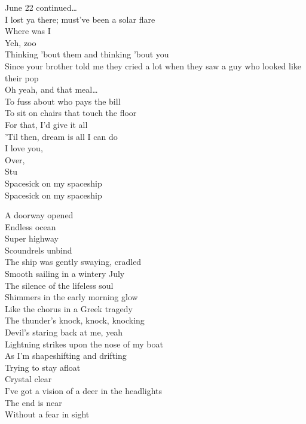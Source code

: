
June 22 continued…\\
I lost ya there; must've been a solar flare\\
Where was I\\
Yeh, zoo\\
Thinking 'bout them and thinking 'bout you\\
Since your brother told me they cried a lot when they saw a guy who looked like their pop\\
Oh yeah, and that meal…\\
To fuss about who pays the bill\\
To sit on chairs that touch the floor\\
For that, I'd give it all\\
'Til then, dream is all I can do\\
I love you,\\
Over,\\
Stu\\

Spacesick on my spaceship\\
Spacesick on my spaceship\\




A doorway opened\\
Endless ocean\\
Super highway\\
Scoundrels unbind\\
The ship was gently swaying, cradled\\
Smooth sailing in a wintery July\\
The silence of the lifeless soul\\
Shimmers in the early morning glow\\
Like the chorus in a Greek tragedy\\
The thunder's knock, knock, knocking\\
Devil's staring back at me, yeah\\

Lightning strikes upon the nose of my boat\\
As I'm shapeshifting and drifting\\
Trying to stay afloat\\
Crystal clear\\
I've got a vision of a deer in the headlights\\
The end is near\\
Without a fear in sight\\

